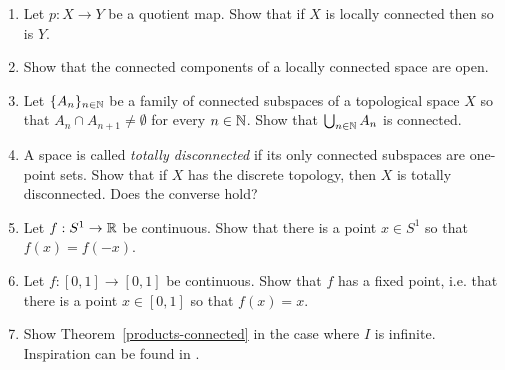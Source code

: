 \begin{enumerate}[label=2.\arabic*]
  \item Let $p : X \to Y$ be a quotient map. Show that if $X$ is locally connected then so is $Y$.
  \item \label{locally-connected-open} Show that the connected components of a locally connected space are open.
  \item Let $\{A_n\}_{n \in \mathbb{N}}$ be a family of connected subspaces of a topological space $X$ so that $A_n \cap A_{n+1} \not= \emptyset$ for every $n \in \mathbb{N}$. Show that $\bigcup_{n \in \mathbb{N}} A_n$ is connected.
  \item A space is called \emph{totally disconnected} if its only connected subspaces are one-point sets. Show that if $X$ has the discrete topology, then $X$ is totally disconnected. Does the converse hold?
  \item Let $f : S^1 \to \mathbb{R}$ be continuous. Show that there is a point $x \in S^1$ so that $f(x) = f(-x)$.
  \item Let $f : [0,1] \to [0,1]$ be continuous. Show that $f$ has a fixed point, i.e. that there is a point $x \in [0,1]$ so that $f(x) = x$.
  \item \label{exercise-products-connected} Show Theorem~\ref{products-connected} in the case where $I$ is infinite. Inspiration can be found in \cite[Ex.~23.7]{Mun}.
\end{enumerate}

